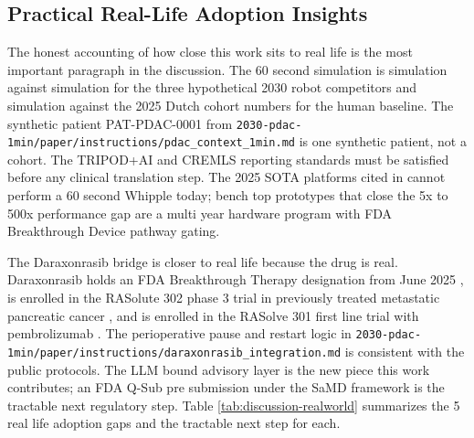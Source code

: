 \subsection{Practical Real-Life Adoption Insights}
\label{sec:discussion-realworld}

The honest accounting of how close this work sits to real life is
the most important paragraph in the discussion. The 60 second
simulation is simulation against simulation for the three
hypothetical 2030 robot competitors and simulation against the
2025 Dutch cohort numbers \cite{DutchCohort2025Whipple} for the
human baseline. The synthetic patient PAT-PDAC-0001 from
\texttt{2030-pdac-1min/paper/instructions/pdac_context_1min.md}
is one synthetic patient, not a cohort. The TRIPOD+AI
\cite{Collins2024TRIPODAI} and CREMLS \cite{ElEmam2024CREMLS}
reporting standards must be satisfied before any clinical
translation step. The 2025 SOTA platforms cited in
\cite{intuitive-davinci-sp, medtronic-hugo-ras, verb-surgical}
cannot perform a 60 second Whipple today; bench top prototypes
that close the 5x to 500x performance gap are a multi year
hardware program with FDA Breakthrough Device pathway gating.

The Daraxonrasib bridge is closer to real life because the drug
is real. Daraxonrasib holds an FDA Breakthrough Therapy
designation from June 2025 \cite{rev-fda-breakthrough}, is
enrolled in the RASolute 302 phase 3 trial in previously treated
metastatic pancreatic cancer \cite{rasolute302}, and is enrolled
in the RASolve 301 first line trial with pembrolizumab
\cite{rasolve301}. The perioperative pause and restart logic in
\texttt{2030-pdac-1min/paper/instructions/daraxonrasib_integration.md}
is consistent with the public protocols. The LLM bound advisory
layer is the new piece this work contributes; an FDA Q-Sub pre
submission under the SaMD framework \cite{fda-samd} is the
tractable next regulatory step. Table \ref{tab:discussion-realworld}
summarizes the 5 real life adoption gaps and the tractable next
step for each.

